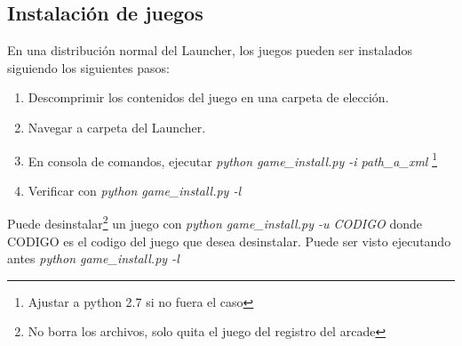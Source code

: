 \documentclass[language=spanish]{article}
\begin{document}
\subsection{Instalación de juegos}

En una distribución normal del Launcher, los juegos pueden ser instalados siguiendo los siguientes pasos:\\
\begin{enumerate}
	\item Descomprimir los contenidos del juego en una carpeta de elección.
	\item Navegar a carpeta del Launcher.
	\item En consola de comandos, ejecutar {\em python game\_install.py -i path\_a\_xml} \footnote{Ajustar a python 2.7 si no fuera el caso}
	\item Verificar con {\em python game\_install.py -l}
\end{enumerate}
Puede desinstalar\footnote{No borra los archivos, solo quita el juego del registro del arcade} un juego con {\em python game\_install.py -u CODIGO} donde CODIGO es el codigo del juego que desea desinstalar. Puede ser visto ejecutando antes {\em python game\_install.py -l}
\end{document}
